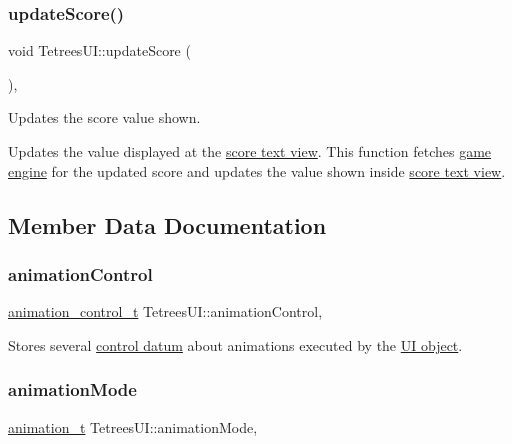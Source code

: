 \subsubsection{\texorpdfstring{update\+Score()}{updateScore()}}
{\footnotesize\ttfamily void Tetrees\+U\+I\+::update\+Score (\begin{DoxyParamCaption}{ }\end{DoxyParamCaption})\hspace{0.3cm}{\ttfamily [static]}, {\ttfamily [private]}}



Updates the score value shown. 

Updates the value displayed at the \hyperlink{TetreesUI_8cpp_aacb77432f2785bad4cb2dd55899b5336}{score text view}. This function fetches \hyperlink{classTetreesUI_a07faa56ea40b28beba7509fa7f65c897}{game engine} for the updated score and updates the value shown inside \hyperlink{TetreesUI_8cpp_aacb77432f2785bad4cb2dd55899b5336}{score text view}. 

\subsection{Member Data Documentation}
\mbox{\label{classTetreesUI_a06df6e44abd5d521448cf1299433b55c}} 
\subsubsection{\texorpdfstring{animation\+Control}{animationControl}}
{\footnotesize\ttfamily \hyperlink{structanimation__control__t}{animation\+\_\+control\+\_\+t} Tetrees\+U\+I\+::animation\+Control\hspace{0.3cm}{\ttfamily [static]}, {\ttfamily [private]}}

Stores several \hyperlink{structanimation__control__t}{control datum} about animations executed by the \hyperlink{classTetreesEngine_a01bf1d438236d5f57129ffb22adf59ce}{UI object}. \mbox{\label{classTetreesUI_af3bd9b55da30d2b324c2dfe2d740d8a2}} 
\subsubsection{\texorpdfstring{animation\+Mode}{animationMode}}
{\footnotesize\ttfamily \hyperlink{TetreesDefs_8hpp_a10487f3bfa31fd7b7b8c20f403f8c947}{animation\+\_\+t} Tetrees\+U\+I\+::animation\+Mode\hspace{0.3cm}{\ttfamily [static]}, {\ttfamily [private]}}

